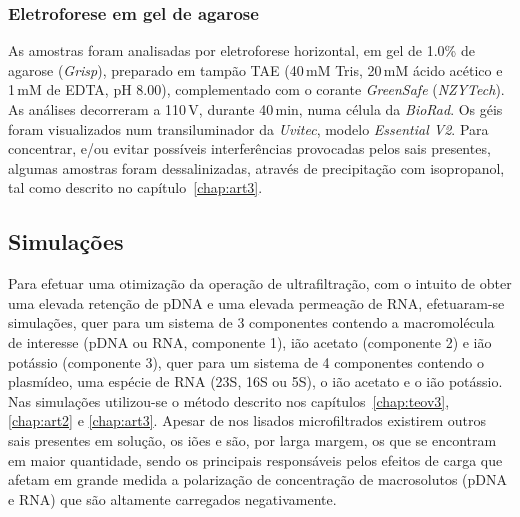 \subsubsection{Eletroforese em gel de agarose} %
\label{ssub:2p4p1art4}
%
As amostras foram analisadas por eletroforese horizontal, em gel de 1.0\% de agarose (\emph{Grisp}), preparado em tampão TAE (40\,mM Tris, 20\,mM ácido acético e 1\,mM de EDTA, pH 8.00), complementado com o corante \emph{GreenSafe} (\emph{NZYTech}).
%
As análises decorreram a 110\,V, durante 40\,min, numa célula da \emph{BioRad}. Os géis foram visualizados num transiluminador da \emph{Uvitec}, modelo \emph{Essential V2}.
%
Para concentrar, e/ou evitar possíveis interferências provocadas pelos sais presentes, algumas amostras foram dessalinizadas, através de precipitação com isopropanol, tal como descrito no capítulo~\ref{chap:art3}.
%

\subsection{Simulações} %
\label{sub:2p5art4}
Para efetuar uma otimização da operação de ultrafiltração, com o intuito de obter uma elevada retenção de pDNA e uma elevada permeação de RNA, efetuaram-se simulações, quer para um sistema de 3 componentes contendo a macromolécula de interesse (pDNA ou RNA, componente 1), ião acetato (componente 2) e ião potássio (componente 3), quer para um sistema de 4 componentes contendo o plasmídeo, uma espécie de RNA (23S, 16S ou 5S), o ião acetato e o ião potássio.
%
%
Nas simulações utilizou-se o método descrito nos capítulos~\ref{chap:teov3}, \ref{chap:art2} e \ref{chap:art3}. Apesar de nos lisados microfiltrados existirem outros sais presentes em solução, os iões  e  são, por larga margem, os que se encontram em maior quantidade, sendo os principais responsáveis pelos efeitos de carga que afetam em grande medida a polarização de concentração de macrosolutos (pDNA e RNA) que são altamente carregados negativamente.
%
%

